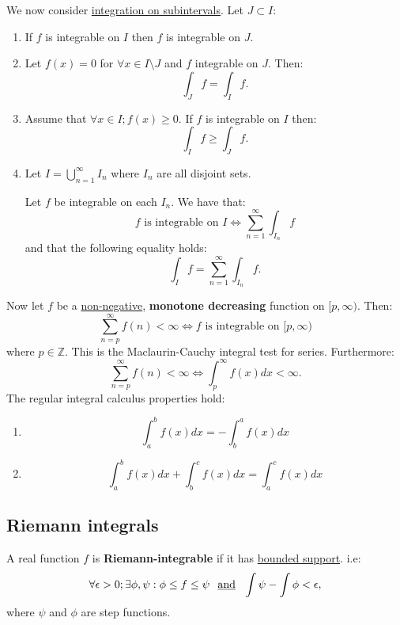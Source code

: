 \documentclass{article}
\begin{document}
We now consider \underline{integration on subintervals}. Let $J\subset I$:
\begin{enumerate}
    \item If $f$ is integrable on $I$ then $f$ is integrable on $J$.

    \item Let $f(x)=0$ for $\forall x\in I\setminus J$ and $f$ integrable on $J$. Then:
    $$\int_J f=\int_I f.$$

    \item Assume that $\forall x\in I; f(x)\geq0$. If $f$ is integrable on $I$ then:
    $$\int_I f\geq\int_J f.$$

    \item Let $I=\displaystyle\bigcup_{n=1}^{\infty}I_n$ where $I_n$ are all disjoint sets.
    
    Let $f$ be integrable on each $I_n$. We have that:
    $$\text{$f$ is integrable on $I$}\iff\sum_{n=1}^{\infty}\int_{I_n}f$$
    and that the following equality holds:
    $$\int_I f=\sum_{n=1}^{\infty}\int_{I_n}f.$$
\end{enumerate}
Now let $f$ be a \underline{non-negative}, \textbf{monotone decreasing} function on $[p,\infty)$. Then:
$$\sum_{n=p}^{\infty}f(n)<\infty\iff\text{$f$ is integrable on $[p,\infty)$}$$
where $p\in\mathbb{Z}$. This is the Maclaurin-Cauchy integral test for series. Furthermore:
$$\sum_{n=p}^{\infty}f(n)<\infty\iff\int_{p}^{\infty}f(x)dx<\infty.$$
The regular integral calculus properties hold:
\begin{enumerate}
    \item $$\int_{a}^{b}f(x)dx=-\int_{b}^{a}f(x)dx$$

    \item $$\int_{a}^{b}f(x)dx+\int_{b}^{c}f(x)dx=\int_{a}^{c}f(x)dx$$
\end{enumerate}

\newpage

\subsection{Riemann integrals}
A real function $f$ is \textbf{Riemann-integrable} if it has \underline{bounded support}. i.e:
$$\forall\epsilon>0; \exists\phi,\psi:\phi\leq f\leq\psi\hspace{0.1in}\text{\underline{and}}
\hspace{0.1in}\int\psi-\int\phi<\epsilon,$$
where $\psi$ and $\phi$ are step functions.
\end{document}
